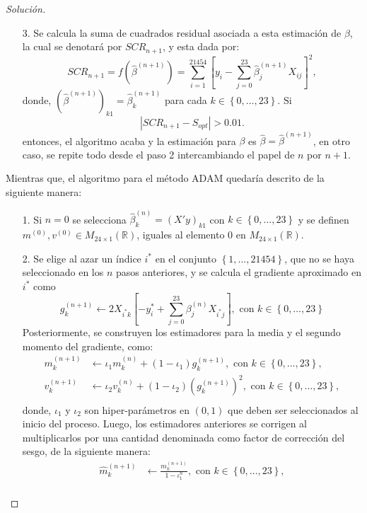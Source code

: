 \documentclass[10.5pt,notitlepage]{article}
\newenvironment{solucion}
  {\begin{proof}[Solución]}
  {\end{proof}}
\newcommand{\RR}{\mathbb{R}}
\newcommand{\abs}[1]{\left\lvert #1 \right\rvert}
\newcommand{\corch}[1]{\left[ #1 \right]}
\newcommand{\kis}[1]{\left\{ #1 \right\}}
\theoremstyle{plain}
\begin{document}
\begin{solucion}
\begin{itemize}
    \item[3.] Se calcula la suma de cuadrados residual asociada a esta estimación de \(\beta\), la cual se denotará por \(SCR_{n+1}\), y esta dada por:
    \[
    SCR_{n+1} = f(\hat{\beta}^{(n+1)}) = \sum_{i = 1}^{21454}\corch{y_i - \sum_{j = 0}^{23}\hat{\beta}_{j}^{(n+1)}X_{ij} }^2,
    \]
    donde, \((\hat{\beta}^{(n+1)})_{k1} =  \hat{\beta}_{k}^{(n+1)}\) para cada \(k\in \kis{0,\hdots,23}\). Si 
    \[
    \abs{SCR_{n+1} - S_{opt}} > 0.01.
    \]
    entonces, el algoritmo acaba y la estimación para \(\beta\) es \( \hat{\beta} =\hat{\beta}^{(n+1)}\), en otro caso, se repite todo desde el paso 2 intercambiando el papel de \(n\) por \(n+1\).
\end{itemize}
Mientras que, el algoritmo para el método ADAM quedaría descrito de la siguiente manera: 
\begin{itemize}
    \item[1.] Si \(n =0\) se selecciona \(\hat{\beta}_{k}^{(n)} = (X'y)_{k1}\) con \(k \in \kis{0, \hdots, 23}\) y se definen \(m^{(0)},v^{(0)} \in M_{24\times 1}(\RR)\), iguales al elemento \(0\) en \(M_{24\times 1}(\RR)\).
    \item[2.] Se elige al azar un índice \(i^*\) en el conjunto \(\kis{1,\hdots,21454}\), que no se haya seleccionado en los \(n\) pasos anteriores, y 
    se calcula el gradiente aproximado en \(i^*\) como 
    \[
    g_{k}^{(n+1)} \leftarrow 2X_{i^*k}\corch{- y_i^* + \sum_{j = 0}^{23}\beta_{j}^{(n)}X_{i^*j}}, \text{ con } k \in \kis{0, \hdots,23}
    \]
    Posteriormente, se construyen los estimadores para la media y el segundo momento del gradiente, como: 
    \begin{align*}
       m_{k}^{(n+1)} &\leftarrow \iota_1 m_k^{(n)} + (1 -\iota_1)g_{k}^{(n+1)}, \text{ con } k \in \kis{0, \hdots,23},\\ 
       v_{k}^{(n+1)} &\leftarrow \iota_2 v_k^{(n)} + (1 -\iota_2)(g_{k}^{(n+1)})^2, \text{ con } k \in \kis{0, \hdots,23},\\            
    \end{align*}
    donde, \(\iota_1\) y \(\iota_2\) son hiper-parámetros en \((0,1)\) que deben ser seleccionados al inicio del proceso. Luego, los estimadores anteriores se corrigen al multiplicarlos por una cantidad denominada como factor de corrección del sesgo, de la siguiente manera:
    \begin{align*}
       \hat{m}_{k}^{(n+1)} &\leftarrow \frac{m_{k}^{(n+1)}}{1 - \iota_{1}^n}, \text{ con } k \in \kis{0, \hdots,23},\\ 

\end{align*}
\end{itemize}
\end{solucion}
\end{document}
